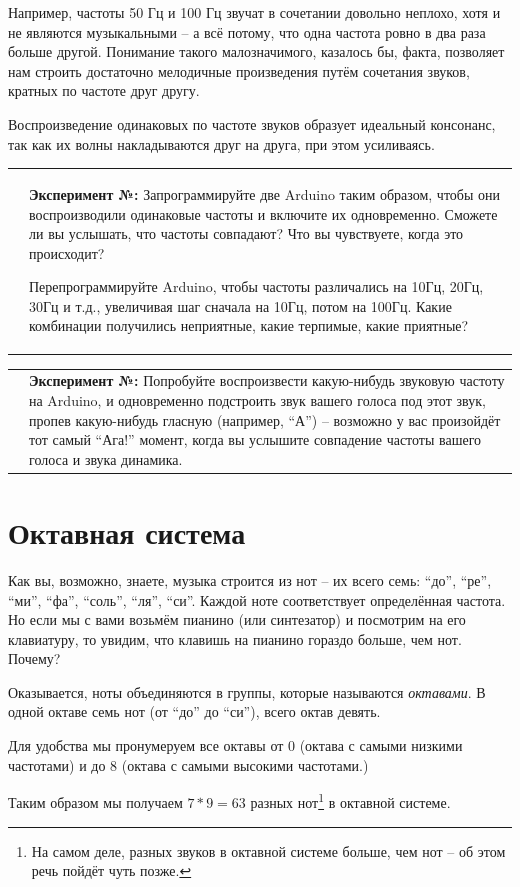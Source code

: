 \documentclass[a4paper,twoside]{book}
\newcounter{experiment-counter}
\newcommand{\experiment}[2]{
  \vspace{8pt}
  \begin{tabularx}{\textwidth}{m{1cm} m{9cm}}
    
    & \textbf{Эксперимент №\arabic{experiment-counter}:} #2 \\
  \end{tabularx}
  \addtocounter{experiment-counter}{1}
}
\begin{document}
Например, частоты 50 Гц и 100 Гц звучат в сочетании довольно неплохо, хотя и не
являются музыкальными -- а всё потому, что одна частота ровно в два раза больше
другой. Понимание такого малозначимого, казалось бы, факта, позволяет нам
строить достаточно мелодичные произведения путём сочетания звуков, кратных по
частоте друг другу.

Воспроизведение одинаковых по частоте звуков образует идеальный консонанс, так
как их волны накладываются друг на друга, при этом усиливаясь.

\experiment{0}{ Запрограммируйте две Arduino таким образом, чтобы они
  воспроизводили одинаковые частоты и включите их одновременно. Сможете ли вы
  услышать, что частоты совпадают?  Что вы чувствуете, когда это происходит?

  Перепрограммируйте Arduino, чтобы частоты различались на 10Гц, 20Гц, 30Гц и
  т.д., увеличивая шаг сначала на 10Гц, потом на 100Гц. Какие комбинации
  получились неприятные, какие терпимые, какие приятные?}

\experiment{1}{ Попробуйте воспроизвести какую-нибудь звуковую частоту на Arduino,
  и одновременно подстроить звук вашего голоса под этот звук, пропев
  какую-нибудь гласную (например, ``А'') -- возможно у вас произойдёт тот самый
  ``Ага!'' момент, когда вы услышите совпадение частоты вашего голоса и звука
  динамика.}

\section{Октавная система}

Как вы, возможно, знаете, музыка строится из нот -- их всего семь: ``до'',
``ре'', ``ми'', ``фа'', ``соль'', ``ля'', ``си''. Каждой ноте соответствует
определённая частота. Но если мы с вами возьмём пианино (или синтезатор) и
посмотрим на его клавиатуру, то увидим, что клавишь на пианино гораздо больше,
чем нот.  Почему?

Оказывается, ноты объединяются в группы, которые называются \emph{октавами}. В
одной октаве семь нот (от ``до'' до ``си''), всего октав девять.

Для удобства мы пронумеруем все октавы от 0 (октава с самыми низкими частотами)
и до 8 (октава с самыми высокими частотами.)

Таким образом мы получаем $7 * 9 = 63$ разных нот\footnote{На самом деле, разных
звуков в октавной системе больше, чем нот -- об этом речь пойдёт чуть позже.} в
октавной системе.
\end{document}

